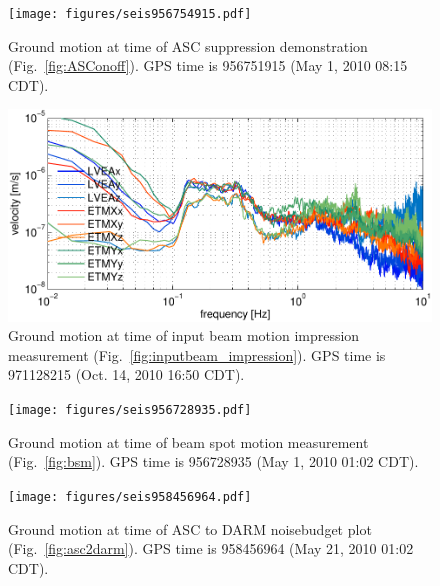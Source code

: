 \begin{figure}
\begin{centering}
\texttt{[image: figures/seis956754915.pdf]}
\caption[]{Ground motion at time of ASC suppression demonstration
  (Fig.~\ref{fig:ASConoff}). GPS time is 956751915 (May 1, 2010 08:15
  CDT).}
\label{fig:seismic_locked}
\end{centering}
\end{figure}

\begin{figure}
\begin{centering}
\includegraphics[width=1.0\textwidth]{figures/seis971128215_highWFSgain.pdf}
\caption[]{Ground motion at time of input beam motion impression
  measurement (Fig.~\ref{fig:inputbeam_impression}). GPS time is
  971128215 (Oct. 14, 2010 16:50 CDT).}
\label{fig:seismic_highgain}
\end{centering}
\end{figure}

\begin{figure}
\begin{centering}
\texttt{[image: figures/seis956728935.pdf]}
\caption[]{Ground motion at time of beam spot motion measurement
  (Fig.~\ref{fig:bsm}). GPS time is 956728935 (May 1, 2010 01:02
  CDT).}
\label{fig:seismic_bsm}
\end{centering}
\end{figure}


\begin{figure}
\begin{centering}
\texttt{[image: figures/seis958456964.pdf]}
\caption[]{Ground motion at time of ASC to DARM noisebudget plot
  (Fig.~\ref{fig:asc2darm}). GPS time is 958456964 (May 21, 2010 01:02
  CDT).}
\label{fig:seismic_NB}
\end{centering}
\end{figure}





